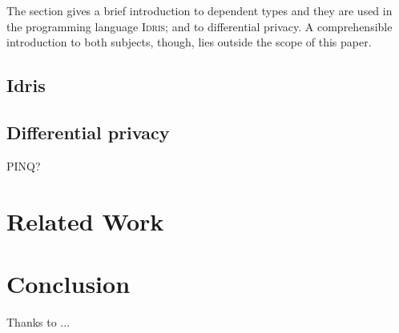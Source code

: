 \documentclass[preprint]{sigplanconf}
\newcommand*{\idris}{\textsc{Idris}\xspace}
\begin{document}
The section gives a brief introduction to dependent types and they are
used in the programming language \idris; and to differential
privacy. A comprehensible introduction to both subjects, though, lies
outside the scope of this paper.

\subsection{Idris}
\label{sec:idris}



\subsection{Differential privacy}
\label{sec:differencial-privacy}

PINQ? 


\section{Related Work}
\label{sec:related-work}


\section{Conclusion}
\label{sec:conclusion}


\acks Thanks to ...








\end{document}
